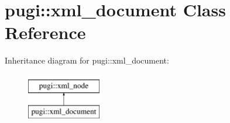 \hypertarget{classpugi_1_1xml__document}{}\section{pugi\+:\+:xml\+\_\+document Class Reference}
\label{classpugi_1_1xml__document}
Inheritance diagram for pugi\+:\+:xml\+\_\+document\+:\begin{figure}[H]
\begin{center}
\leavevmode
\includegraphics[height=2.000000cm]{classpugi_1_1xml__document}
\end{center}
\end{figure}
